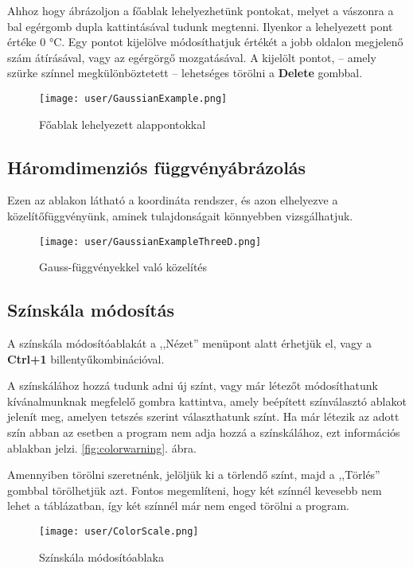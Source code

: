 			Ahhoz hogy ábrázoljon a főablak lehelyezhetünk pontokat, melyet a vászonra a bal egérgomb dupla kattintásával tudunk megtenni. Ilyenkor a lehelyezett pont értéke $0$ °C. Egy pontot kijelölve módosíthatjuk értékét a jobb oldalon megjelenő szám átírásával, vagy az egérgörgő mozgatásával. A kijelölt pontot, -- amely szürke színnel megkülönböztetett -- lehetséges törölni a \textbf{Delete} gombbal. 
			
			\begin{figure}[ht]
				\centering
				\texttt{[image: user/GaussianExample.png]}
				\caption{Főablak lehelyezett alappontokkal}
			\end{figure}
		
		\subsection{Háromdimenziós függvényábrázolás}
		
		Ezen az ablakon látható a koordináta rendszer, és azon elhelyezve a közelítőfüggvényünk, aminek tulajdonságait könnyebben vizsgálhatjuk. 
		\begin{figure}[ht]
			\centering
			\texttt{[image: user/GaussianExampleThreeD.png]}
			\caption{Gauss-függvényekkel való közelítés}
		\end{figure}
		
		\subsection{Színskála módosítás}
			A színskála módosítóablakát a ,,Nézet'' menüpont alatt érhetjük el, vagy a \textbf{Ctrl+1} billentyűkombinációval. 
			
			A színskálához hozzá tudunk adni új színt, vagy már létezőt módosíthatunk kívánalmunknak megfelelő gombra kattintva, amely beépített színválasztó ablakot jelenít meg, amelyen tetszés szerint választhatunk színt. Ha már létezik az adott szín abban az esetben a program nem adja hozzá a színskálához, ezt információs ablakban jelzi. \ref{fig:colorwarning}. ábra.
			
			Amennyiben törölni szeretnénk, jelöljük ki a törlendő színt, majd a ,,Törlés'' gombbal törölhetjük azt. Fontos megemlíteni, hogy két színnél kevesebb nem lehet a táblázatban, így két színnél már nem enged törölni a program. 
			\begin{figure}[ht]
				\centering
				\texttt{[image: user/ColorScale.png]}
				\caption{Színskála módosítóablaka}
				
			\end{figure}
		
